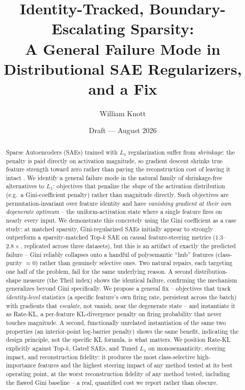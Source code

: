 \documentclass[11pt,twocolumn]{article}
\title{\textbf{Identity-Tracked, Boundary-Escalating Sparsity:\\A General Failure Mode in Distributional SAE Regularizers, and a Fix}}
\author{William Knott\\}
\date{Draft --- August 2026}
\begin{document}
\maketitle

\begin{abstract}
Sparse Autoencoders (SAEs) trained with $L_1$ regularization suffer from \textit{shrinkage}: the penalty is paid directly on activation magnitude, so gradient descent shrinks true feature strength toward zero rather than paying the reconstruction cost of leaving it intact \citep{wright2024addressing}. We identify a general failure mode in the natural family of shrinkage-free alternatives to $L_1$: objectives that penalize the \emph{shape} of the activation distribution (e.g.\ a Gini-coefficient penalty) rather than magnitude directly. Such objectives are permutation-invariant over feature identity and have \emph{vanishing gradient at their own degenerate optimum} -- the uniform-activation state where a single feature fires on nearly every input. We demonstrate this concretely using the Gini coefficient as a case study: at matched sparsity, Gini-regularized SAEs initially appear to strongly outperform a sparsity-matched Top-$k$ SAE on causal feature-steering metrics ($1.3$--$2.8\times$, replicated across three datasets), but this is an artifact of exactly the predicted failure -- Gini reliably collapses onto a handful of polysemantic ``hub'' features (class-purity $\approx 0$) rather than genuinely selective ones. Two natural repairs, each targeting one half of the problem, fail for the same underlying reason. A second distribution-shape measure (the Theil index) shows the identical failure, confirming the mechanism generalizes beyond Gini specifically. We propose a general fix -- objectives that track \emph{identity-level} statistics (a specific feature's own firing rate, persistent across the batch) with gradients that \emph{escalate}, not vanish, near the degenerate state -- and instantiate it as Rate-KL, a per-feature KL-divergence penalty on firing probability that never touches magnitude. A second, functionally unrelated instantiation of the same two properties (an interior-point log-barrier penalty) shows the same benefit, indicating the design principle, not the specific KL formula, is what matters. We position Rate-KL explicitly against Top-$k$, Gated SAEs, and Tuned $L_1$ on monosemanticity, steering impact, and reconstruction fidelity: it produces the most class-selective high-importance features and the highest steering impact of any method tested at its best operating point, at the worst reconstruction fidelity of any method tested, including the flawed Gini baseline -- a real, quantified cost we report rather than obscure.
\end{abstract}
\end{document}
